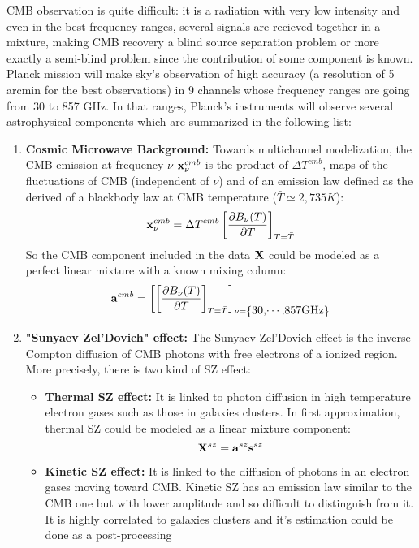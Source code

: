 CMB observation is quite difficult: it is a radiation with very low intensity and even in the best frequency ranges, several signals are recieved together in 
a mixture, making CMB recovery a blind source separation problem or more exactly a semi-blind problem since the contribution of some component is known. Planck mission 
will make sky's observation of high accuracy (a resolution of 5 arcmin for the best observations) in 9 channels whose frequency ranges are going from 30 to 857 GHz.
In that ranges, Planck's instruments will observe several astrophysical components which are summarized in the following list:
\begin{enumerate}
\item {\bf Cosmic Microwave Background:} Towards multichannel modelization, the CMB emission at frequency $\nu$ ${\bf x}_\nu^{cmb}$ is the product of $\Delta T^{cmb}$, 
maps of the fluctuations of CMB (independent of $\nu$) and of an emission law defined as the derived of a blackbody law at CMB temperature ($\bar{T} \simeq 2,735K$):
\begin{equation}
{\bf x}_\nu^{cmb} = \Delta T^{cmb} \left[ \frac{\partial B_\nu(T)}{\partial T} \right]_{T = \bar{T}}
\end{equation}
So the CMB component included in the data $\bf X$ could be modeled as a perfect linear mixture with a known mixing column:
\begin{equation}
{\bf a}^{cmb} = \left[\left[ \frac{\partial B_\nu(T)}{\partial T} \right]_{T = \bar{T}}\right]_{\nu=\left\{\mbox{30,$\cdots$,857GHz}\right\}}
\end{equation}
\item {\bf "Sunyaev Zel'Dovich" effect:} The Sunyaev Zel'Dovich effect is the inverse Compton diffusion of CMB photons with free electrons of a ionized region. 
More precisely, there is two kind of SZ effect:
\begin{itemize}
\item {\bf Thermal SZ effect:} It is linked to photon diffusion in high temperature electron gases such as those in galaxies clusters. In first approximation, thermal SZ 
could be modeled as a linear mixture component:
\begin{equation}
{\bf X}^{sz} = {\bf a}^{sz}{\bf s}^{sz}
\end{equation}
\item {\bf Kinetic SZ effect:} It is linked to the diffusion of photons in an electron gases moving toward CMB. Kinetic SZ has an emission law similar to the CMB one 
but with lower amplitude and so difficult to distinguish from it. It is highly correlated to galaxies clusters and it's estimation could be done as a post-processing 

\end{itemize}
\end{enumerate}
